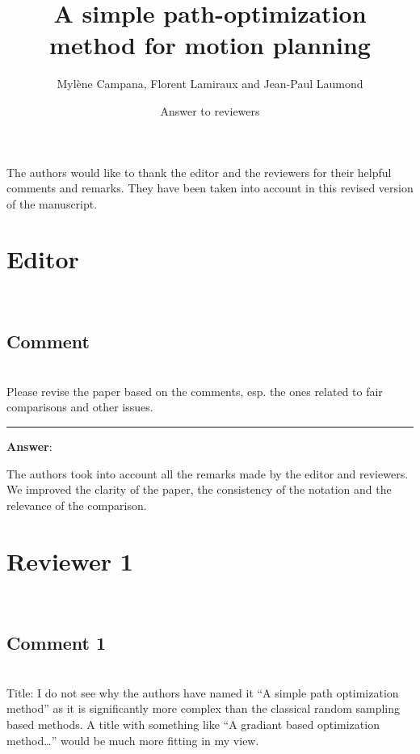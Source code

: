 \documentclass{scrartcl}
\begin{document}
\title{A simple path-optimization method for motion planning}
\author{Myl\`{e}ne Campana, Florent Lamiraux and Jean-Paul Laumond}
\date{Answer to reviewers}
\maketitle

The authors would like to thank the editor and the reviewers for their helpful comments and remarks.
They have been taken into account in this revised version of the manuscript.

\section{Editor}

\hrulefill\\

\subsection{Comment}
\hrulefill\\

Please revise the paper based on the comments, esp. the ones related to fair comparisons and other issues.

\rule{\linewidth}{.1pt}
\textbf{Answer}:

The authors took into account all the remarks made by the editor and reviewers.
We improved the clarity of the paper, the consistency of the notation and the relevance of the comparison.

 
\section{Reviewer 1}
\label{r2}
\hrulefill\\

\subsection{Comment 1}
\hrulefill\\

Title:
I do not see why the authors have named it “A simple path optimization method” as it is significantly more complex than the classical random sampling based methods. A title with something like “A gradiant based optimization method…” would be much more fitting in my view.
\end{document}
